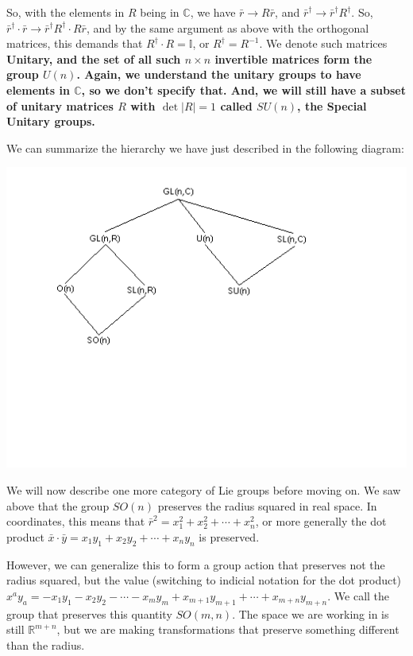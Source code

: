 \documentclass[12pt,epsf]{article}
\begin{document}
So, with the elements in $R$ being in $\mathbb{C}$, we have $\bar r
\rightarrow R\bar r$, and $\bar r^{\dagger} \rightarrow \bar
r^{\dagger} R^{\dagger}$.  So, $\bar r^{\dagger}\cdot \bar r
\rightarrow \bar r^{\dagger} R^{\dagger} \cdot R \bar r$, and by the
same argument as above with the orthogonal matrices, this demands that
$R^{\dagger} \cdot R = \mathbb{I}$, or $R^{\dagger} = R^{-1}$.	We
denote such matrices \bf Unitary\rm, and the set of all such $n\times
n$ invertible matrices form the group $U(n)$.  Again, we understand the
unitary groups to have elements in $\mathbb{C}$, so we don't specify that. 
And, we will still have a subset of unitary matrices $R$ with $\det|R| =
1$ called $SU(n)$, the \bf Special Unitary \rm groups.	

We can summarize the hierarchy we have just described in the following
diagram:
\begin{center}
\includegraphics{liegroups.PNG}
\end{center}

We will now describe one more category of Lie groups before
moving on.  We saw above that the group $SO(n)$ preserves the radius
squared in real space.	In coordinates, this means that $\bar r^2 =
x_1^2+x_2^2+\cdots+x_n^2$, or more generally the dot product $\bar x
\cdot \bar y = x_1y_1+x_2y_2+\cdots + x_ny_n$ is preserved.  

However, we can generalize this to form a group action that preserves
not the radius squared, but the value (switching to indicial notation
for the dot product) $x^ay_a = -x_1y_1 - x_2y_2 - \cdots - x_my_m +
x_{m+1}y_{m+1} + \cdots + x_{m+n}y_{m+n}$.  We call the group that
preserves this quantity $SO(m,n)$.  The space we are working in is
still $\mathbb{R}^{m+n}$, but we are making transformations that
preserve something different than the radius.  
\end{document}
